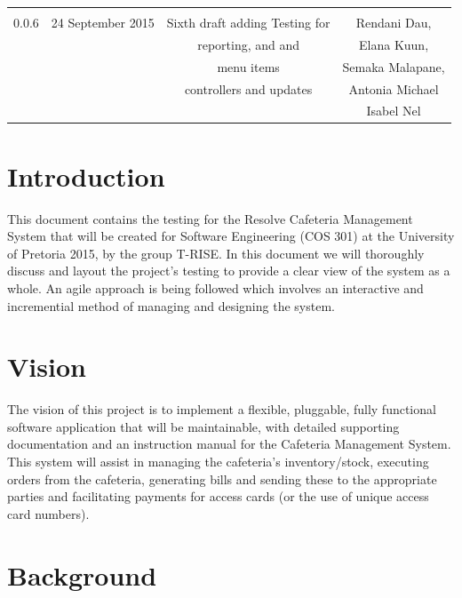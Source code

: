 \documentclass[a4paper,12pt]{report}
\begin{document}
\begin{table}[h!]
\begin{tabular}{||c c c c||}
& & & \\
 \hline 
 & & & \\
 0.0.6 & 24 September 2015 &  Sixth draft adding Testing for  & Rendani Dau, \\ & & reporting, and and & Elana Kuun, \\ & & menu items & Semaka Malapane, \\ & & controllers and updates &  Antonia Michael \\ & & & Isabel Nel \\   [1ex] 
 \hline
 \end{tabular}
\end{table} 

\pagebreak
\section{Introduction}
This document contains the   testing for the Resolve Cafeteria Management System that will be created for Software Engineering (COS 301) at the University of Pretoria 2015, by the group T-RISE. In this document we will thoroughly discuss and layout the project's testing to provide a clear view of the system as a whole. An agile approach is being followed which involves an interactive and incremential method of managing and designing the system. 

\section{Vision}
The vision of this project is to implement a flexible, pluggable, fully functional software application that will be maintainable, with detailed supporting documentation and an instruction manual for the Cafeteria Management System. This system will assist in managing the cafeteria's inventory/stock, executing orders from the cafeteria, generating bills and sending these to the appropriate parties and facilitating payments for access cards (or the use of unique access card numbers). 

\section{Background}
\end{document}
